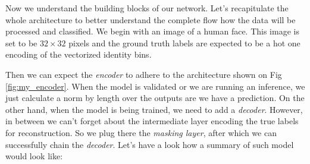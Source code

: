Now we understand the building blocks of our network. Let's recapitulate the whole architecture to better understand the complete flow how the data will be processed and classified. We begin with an image of a human face. This image is set to be $32\times32$ pixels and the ground truth labels are expected to be a hot one encoding of the vectorized identity bins.

Then we can expect the \textit{encoder} to adhere to the architecture shown on Fig\,\ref{fig:my_encoder}. When the model is validated or we are running an inference, we just calculate a norm by length over the outputs are we have a prediction. On the other hand, when the model is being trained, we need to add a \textit{decoder}. However, in between we can't forget about the intermediate layer encoding the true labels for reconstruction. So we plug there the \textit{masking layer}, after which we can successfully chain the \textit{decoder}. Let's have a look how a summary of such model would look like:


